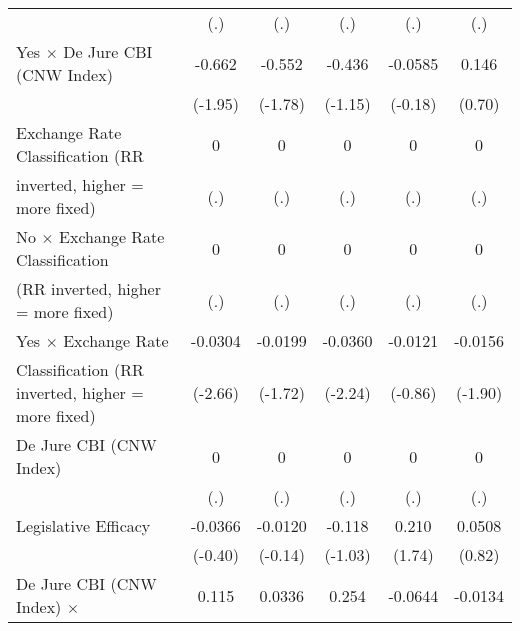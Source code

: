 {\begin{tabular}{l*{5}{c}}
                                        &       (.)         &       (.)         &       (.)         &       (.)         &       (.)         \\
\addlinespace
Yes $\times$ De Jure CBI (CNW Index)    &    -0.662         &    -0.552         &    -0.436         &   -0.0585         &     0.146         \\
                                        &   (-1.95)         &   (-1.78)         &   (-1.15)         &   (-0.18)         &    (0.70)         \\
\addlinespace
Exchange Rate Classification (RR        &         0         &         0         &         0         &         0         &         0         \\
inverted, higher = more fixed)          &       (.)         &       (.)         &       (.)         &       (.)         &       (.)         \\
\addlinespace
No $\times$ Exchange Rate Classification&         0         &         0         &         0         &         0         &         0         \\
(RR inverted, higher = more fixed)      &       (.)         &       (.)         &       (.)         &       (.)         &       (.)         \\
\addlinespace
Yes $\times$ Exchange Rate              &   -0.0304\sym{**} &   -0.0199         &   -0.0360\sym{*}  &   -0.0121         &   -0.0156         \\
Classification (RR inverted, higher = more fixed)&   (-2.66)         &   (-1.72)         &   (-2.24)         &   (-0.86)         &   (-1.90)         \\
\addlinespace
De Jure CBI (CNW Index)                 &         0         &         0         &         0         &         0         &         0         \\
                                        &       (.)         &       (.)         &       (.)         &       (.)         &       (.)         \\
\addlinespace
Legislative Efficacy                    &   -0.0366         &   -0.0120         &    -0.118         &     0.210         &    0.0508         \\
                                        &   (-0.40)         &   (-0.14)         &   (-1.03)         &    (1.74)         &    (0.82)         \\
\addlinespace
De Jure CBI (CNW Index) $\times$        &     0.115         &    0.0336         &     0.254         &   -0.0644         &   -0.0134         \\

\end{tabular}}
